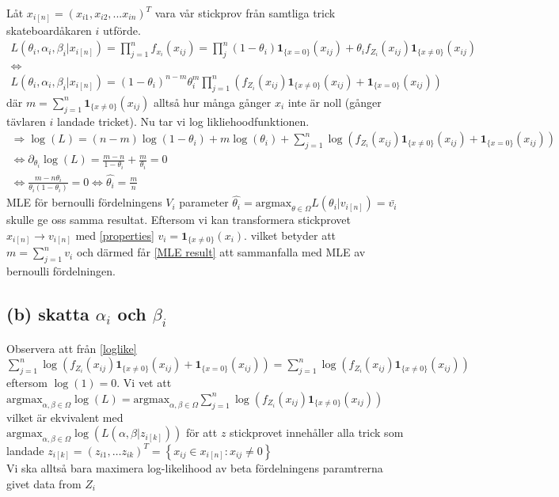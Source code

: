 \documentclass{assignment}
\newcommand{\indicator}[1]{\mathbf{1}_{\{#1\}}}
\begin{document}
Låt $x_{i[n]} = (x_{i1},x_{i2},...x_{in})^T$ vara vår stickprov från samtliga trick skateboardåkaren $i$ utförde.
\begin{align}
    L(\theta_{i},\alpha_{i},\beta_{i}|x_{i[n]}) = \prod_{j=1}^nf_{x_{i}}(x_{ij}) = \prod_{j}^n (1-\theta_i) \indicator{x=0} (x_{ij}) + \theta_if_{Z_i}(x_{ij})\indicator{x\neq0}(x_{ij})
    \\ \Longleftrightarrow \nonumber
    \\ L(\theta_{i},\alpha_{i},\beta_{i}|x_{i[n]}) = (1-\theta_i)^{n-m}\theta_i^{m}\prod_{j=1}^n\left(f_{Z_i}(x_{ij})\indicator{x\neq0}(x_{ij}) + \indicator{x=0}(x_{ij})\right) 
\end{align}
där $m=\sum_{j=1}^n \indicator{x\neq0}(x_{ij})$ alltså hur många gånger $x_{i}$ inte är noll (gånger tävlaren $i$ landade tricket).
Nu tar vi log likliehoodfunktionen.
\begin{align}
    \Longrightarrow \log(L) = (n-m)\log(1-\theta_i)+m\log(\theta_i)+ \sum_{j=1}^n \log \left(f_{Z_i}(x_{ij})\indicator{x\neq0}(x_{ij}) + \indicator{x=0}(x_{ij})\right) \label{loglike}
    \\ \Longleftrightarrow \partial_{\theta_i}\log(L) = \frac{m-n}{1-\theta_i} + \frac{m}{\theta_i} = 0 \label{blah}
    \\ \Longleftrightarrow \frac{m-n\theta_i}{\theta_i(1-\theta_i)} = 0 \Longleftrightarrow \hat{\theta_i} = \frac{m}{n} \label{MLE result}
\end{align}
MLE för bernoulli fördelningens $V_i$ parameter $\hat{\theta_i} = \text{argmax}_{\theta\in\Omega} L(\theta_i|v_{i[n]}) = \bar{v_i}$ skulle ge oss samma resultat. Eftersom vi kan transformera stickprovet $x_{i[n]}\rightarrow v_{i[n]}$ med \cref{properties} $v_i=\indicator{x\neq0}(x_i)$.
vilket betyder att $m=\sum_{j=1}^n v_i$ och därmed får \cref{MLE result} att sammanfalla med MLE av bernoulli fördelningen. 
\subsection*{(b) skatta $\alpha_i$ och $\beta_i$}
Observera att från \cref{loglike}  $\sum_{j=1}^n \log \left(f_{Z_i}(x_{ij})\indicator{x\neq0}(x_{ij}) + \indicator{x=0}(x_{ij})\right) = \sum_{j=1}^n \log \left(f_{Z_i}(x_{ij})\indicator{x\neq0}(x_{ij})\right)$ eftersom $\log(1)=0$.
Vi vet att 
\\ $\text{argmax}_{\alpha,\beta\in\Omega}\log(L)=\text{argmax}_{\alpha,\beta\in\Omega}\sum_{j=1}^n \log \left(f_{Z_i}(x_{ij})\indicator{x\neq0}(x_{ij})\right)$ vilket är ekvivalent med 
\\$\text{argmax}_{\alpha,\beta\in\Omega} \log(L(\alpha,\beta|z_{i[k]}))$ för att $z$ stickprovet innehåller alla trick som landade $z_{i[k]}=(z_{i1},\dots z_{ik})^T = \left\{x_{ij}\in x_{i[n]} : x_{ij}\neq 0\right\}$
\\ Vi ska alltså bara maximera log-likelihood av beta fördelningens paramtrerna givet data from $Z_i$
\end{document}
